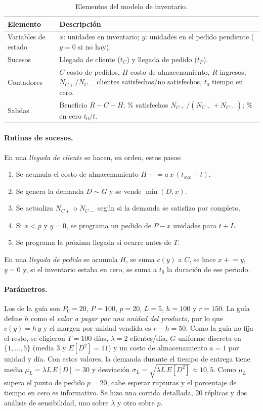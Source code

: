 \documentclass[11pt,a4paper]{article}
\begin{document}
\begin{table}[H]\centering\small
\caption{Elementos del modelo de inventario.}\label{tab:elem_inv}
\begin{tabular}{p{}p{}}\toprule
\textbf{Elemento}&\textbf{Descripción}\\\midrule
Variables de estado&$x$: unidades en inventario; $y$: unidades en el pedido pendiente
($y=0$ si no hay).\\
Sucesos&Llegada de cliente ($t_C$) y llegada de pedido ($t_P$).\\
Contadores&$C$ costo de pedidos, $H$ costo de almacenamiento, $R$ ingresos,
$N_{C+}$/$N_{C-}$ clientes satisfechos/no satisfechos, $t_0$ tiempo en cero.\\
Salidas&Beneficio $R-C-H$; $\%$ satisfechos $N_{C+}/(N_{C+}+N_{C-})$; $\%$ en cero
$t_0/t$.\\\bottomrule
\end{tabular}\end{table}

\paragraph{Rutinas de sucesos.} En una \emph{llegada de cliente} se hacen, en orden, estos
pasos:
\begin{enumerate}[label=\arabic*.]
 \item Se acumula el costo de almacenamiento $H\mathrel{+}=a\,x\,(t_{suc}-t)$.
 \item Se genera la demanda $D\sim G$ y se vende $\min(D,x)$.
 \item Se actualiza $N_{C+}$ o $N_{C-}$ según si la demanda se satisfizo por completo.
 \item Si $x<p$ y $y=0$, se programa un pedido de $P-x$ unidades para $t+L$.
 \item Se programa la próxima llegada si ocurre antes de $T$.
\end{enumerate}
En una \emph{llegada de pedido} se acumula $H$, se suma $c(y)$ a $C$, se hace $x\mathrel{+}=y$,
$y=0$ y, si el inventario estaba en cero, se suma a $t_0$ la duración de ese periodo.

\paragraph{Parámetros.} Los de la guía son $P_0=20$, $P=100$, $p=20$, $L=5$, $h=100$ y
$r=150$. La guía define $h$ como el \emph{valor a pagar por una unidad del producto}, por lo
que $c(y)=h\,y$ y el margen por unidad vendida es $r-h=50$. Como la guía no fija el resto,
se eligieron $T=100$ días, $\lambda=2$ clientes/día, $G$ uniforme discreta en
$\{1,\dots,5\}$ (media 3 y $E[D^2]=11$) y un costo de almacenamiento $a=1$ por unidad y
día. Con estos valores, la demanda durante el tiempo de entrega tiene media
$\mu_L=\lambda L\,E[D]=30$ y desviación $\sigma_L=\sqrt{\lambda L\,E[D^2]}\approx10{,}5$.
Como $\mu_L$ supera el punto de pedido $p=20$, cabe esperar rupturas y el porcentaje de
tiempo en cero es informativo. Se hizo una corrida detallada, 20 réplicas y dos análisis de
sensibilidad, uno sobre $\lambda$ y otro sobre $p$.
\end{document}
